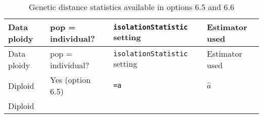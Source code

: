 \documentclass[12pt,]{book}
\theoremstyle{definition}
\theoremstyle{definition}
\theoremstyle{definition}
\theoremstyle{remark}
\begin{document}
\begin{longtable}[]{@{}llll@{}}
\caption{\label{tab:isolstats} Genetic distance statistics available in
options 6.5 and 6.6}\tabularnewline
\toprule
\begin{minipage}[b]{0.08\columnwidth}\raggedright\strut
Data ploidy\strut
\end{minipage} & \begin{minipage}[b]{0.16\columnwidth}\raggedright\strut
pop = individual?\strut
\end{minipage} & \begin{minipage}[b]{0.19\columnwidth}\raggedright\strut
\texttt{isolationStatistic} setting\strut
\end{minipage} & \begin{minipage}[b]{0.45\columnwidth}\raggedright\strut
Estimator used\strut
\end{minipage}\tabularnewline
\midrule
\endfirsthead
\toprule
\begin{minipage}[b]{0.08\columnwidth}\raggedright\strut
Data ploidy\strut
\end{minipage} & \begin{minipage}[b]{0.16\columnwidth}\raggedright\strut
pop = individual?\strut
\end{minipage} & \begin{minipage}[b]{0.19\columnwidth}\raggedright\strut
\texttt{isolationStatistic} setting\strut
\end{minipage} & \begin{minipage}[b]{0.45\columnwidth}\raggedright\strut
Estimator used\strut
\end{minipage}\tabularnewline
\midrule
\endhead
\begin{minipage}[t]{0.08\columnwidth}\raggedright\strut
Diploid\strut
\end{minipage} & \begin{minipage}[t]{0.16\columnwidth}\raggedright\strut
Yes (option 6.5)\strut
\end{minipage} & \begin{minipage}[t]{0.19\columnwidth}\raggedright\strut
\texttt{=a}\strut
\end{minipage} & \begin{minipage}[t]{0.45\columnwidth}\raggedright\strut
\(\hat{a}\)\strut
\end{minipage}\tabularnewline
\begin{minipage}[t]{0.08\columnwidth}\raggedright\strut
Diploid\strut
\end{minipage} & \begin{minipage}[t]{0.16\columnwidth}\raggedright\strut

\end{minipage}
\end{longtable}
\end{document}
